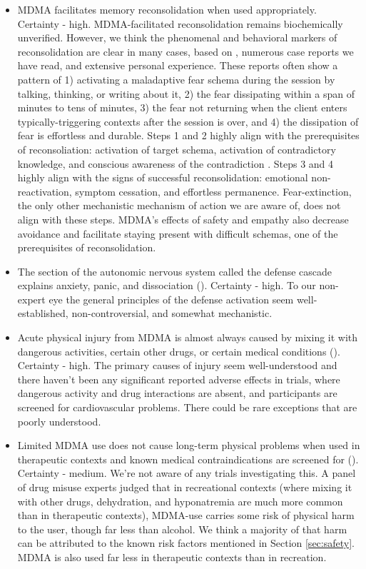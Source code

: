 \documentclass[12pt,letterpaper]{book}
\begin{document}
\begin{itemize}
	\item MDMA facilitates memory reconsolidation when used appropriately. Certainty - high. MDMA-facilitated reconsolidation remains biochemically unverified. However, we think the phenomenal and behavioral markers of reconsolidation are clear in many cases, based on \textcite{fedduciaMDMAMemoryReconsolidation}, numerous case reports we have read, and extensive personal experience. These reports often show a pattern of 1) activating a maladaptive fear schema during the session by talking, thinking, or writing about it, 2) the fear dissipating within a span of minutes to tens of minutes, 3) the fear not returning when the client enters typically-triggering contexts after the session is over, and 4) the dissipation of fear is effortless and durable. Steps 1 and 2 highly align with the prerequisites of reconsoliation: activation of target schema, activation of contradictory knowledge, and conscious awareness of the contradiction \cite{eckerUnlocking}. Steps 3 and 4 highly align with the signs of successful reconsolidation: emotional non-reactivation, symptom cessation, and effortless permanence. Fear-extinction, the only other mechanistic mechanism of action we are aware of, does not align with these steps. MDMA's effects of safety and empathy also decrease avoidance and facilitate staying present with difficult schemas, one of the prerequisites of reconsolidation.
	\item The section of the autonomic nervous system called the defense cascade explains anxiety, panic, and dissociation (\textcite{kozlowskaDefenseCascade}). Certainty - high. To our non-expert eye the general principles of the defense activation seem well-established, non-controversial, and somewhat mechanistic.
	\item Acute physical injury from MDMA is almost always caused by mixing it with dangerous activities, certain other drugs, or certain medical conditions (\textcite{wolfgang2025}). Certainty - high. The primary causes of injury seem well-understood and there haven't been any significant reported adverse effects in trials, where dangerous activity and drug interactions are absent, and participants are screened for cardiovascular problems. There could be rare exceptions that are poorly understood.
	\item Limited MDMA use does not cause long-term physical problems when used in therapeutic contexts and known medical contraindications are screened for (\textcite{nuttDrugHarms}). Certainty - medium. We're not aware of any trials investigating this. A panel of drug misuse experts judged that in recreational contexts (where mixing it with other drugs, dehydration, and hyponatremia are much more common than in therapeutic contexts), MDMA-use carries some risk of physical harm to the user, though far less than alcohol. We think a majority of that harm can be attributed to the known risk factors mentioned in Section \ref{sec:safety}. MDMA is also used far less in therapeutic contexts than in recreation.

\end{itemize}
\end{document}
